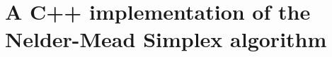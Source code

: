 \documentclass[twoside,english]{uiofysmaster}
\begin{document}

























\appendix

\chapter{A C++ implementation of the Nelder-Mead Simplex algorithm}
\label{ch:simplex}
\end{document}
